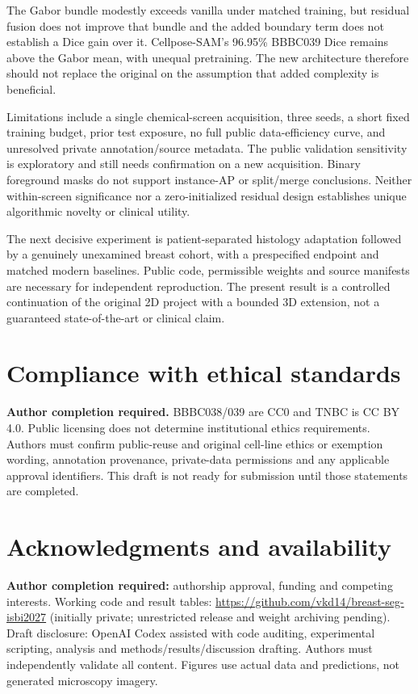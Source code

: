 \documentclass{article}
\begin{document}
The Gabor bundle modestly exceeds vanilla under matched training, but residual fusion does not improve that bundle and the added boundary term does not establish a Dice gain over it. Cellpose-SAM's 96.95\% BBBC039 Dice remains above the Gabor mean, with unequal pretraining. The new architecture therefore should not replace the original on the assumption that added complexity is beneficial.

Limitations include a single chemical-screen acquisition, three seeds, a short fixed training budget, prior test exposure, no full public data-efficiency curve, and unresolved private annotation/source metadata. The public validation sensitivity is exploratory and still needs confirmation on a new acquisition. Binary foreground masks do not support instance-AP or split/merge conclusions. Neither within-screen significance nor a zero-initialized residual design establishes unique algorithmic novelty or clinical utility.

The next decisive experiment is patient-separated histology adaptation followed by a genuinely unexamined breast cohort, with a prespecified endpoint and matched modern baselines. Public code, permissible weights and source manifests are necessary for independent reproduction. The present result is a controlled continuation of the original 2D project with a bounded 3D extension, not a guaranteed state-of-the-art or clinical claim.

\section{Compliance with ethical standards}
\textbf{Author completion required.} BBBC038/039 are CC0 and TNBC is CC BY 4.0. Public licensing does not determine institutional ethics requirements. Authors must confirm public-reuse and original cell-line ethics or exemption wording, annotation provenance, private-data permissions and any applicable approval identifiers. This draft is not ready for submission until those statements are completed.

\section{Acknowledgments and availability}
\textbf{Author completion required:} authorship approval, funding and competing interests. Working code and result tables: \url{https://github.com/vkd14/breast-seg-isbi2027} (initially private; unrestricted release and weight archiving pending). Draft disclosure: OpenAI Codex assisted with code auditing, experimental scripting, analysis and methods/results/discussion drafting. Authors must independently validate all content. Figures use actual data and predictions, not generated microscopy imagery.
\end{document}
